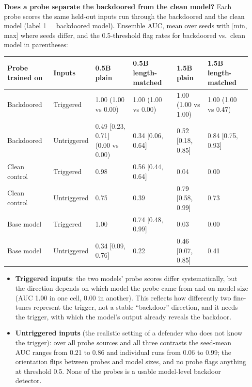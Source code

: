 \documentclass[11pt,letterpaper]{article}
\begin{document}
\textbf{Does a probe separate the backdoored from the clean model?} Each probe scores the same held-out inputs run through the backdoored and the clean model (label 1 = backdoored model). Ensemble AUC, mean over seeds with [min, max] where seeds differ, and the 0.5-threshold flag rates for backdoored vs.\ clean model in parentheses:

\begin{center}
\footnotesize
\begin{tabular}{L{2.2cm}L{1.9cm}L{2.6cm}L{2.6cm}L{2.6cm}L{2.6cm}}
\toprule
\textbf{Probe trained on} & \textbf{Inputs} & \textbf{0.5B plain} & \textbf{0.5B length-matched} & \textbf{1.5B plain} & \textbf{1.5B length-matched} \\
\midrule
{} Backdoored & Triggered & 1.00 (1.00 vs 0.00) & 1.00 (1.00 vs 0.00) & 1.00 (1.00 vs 1.00) & 1.00 (1.00 vs 0.47) \\
Backdoored & Untriggered & 0.49 [0.23, 0.71] (0.00 vs 0.00) & 0.34 [0.06, 0.64] & 0.52 [0.18, 0.85] & 0.84 [0.75, 0.93] \\
 Clean control & Triggered & 0.98 & 0.56 [0.44, 0.64] & 0.04 & 0.00 \\
Clean control & Untriggered & 0.75 & 0.39 & 0.79 [0.58, 0.99] & 0.73 \\
 Base model & Triggered & 1.00 & 0.74 [0.48, 0.99] & 0.03 & 0.00 \\
Base model & Untriggered & 0.34 [0.09, 0.76] & 0.22 & 0.46 [0.07, 0.85] & 0.41 \\
\bottomrule
\end{tabular}
\end{center}

\begin{itemize}[nosep]
  \item \textbf{Triggered inputs}: the two models' probe scores differ systematically, but the direction depends on which model the probe came from and on model size (AUC 1.00 in one cell, 0.00 in another). This reflects how differently two fine-tunes represent the trigger, not a stable ``backdoor'' direction, and it needs the trigger, with which the model's output already reveals the backdoor.
  \item \textbf{Untriggered inputs} (the realistic setting of a defender who does not know the trigger): over all probe sources and all three contrasts the seed-mean AUC ranges from 0.21 to 0.86 and individual runs from 0.06 to 0.99; the orientation flips between probes and model sizes, and no probe flags anything at threshold 0.5. None of the probes is a usable model-level backdoor detector.
\end{itemize}
\end{document}
